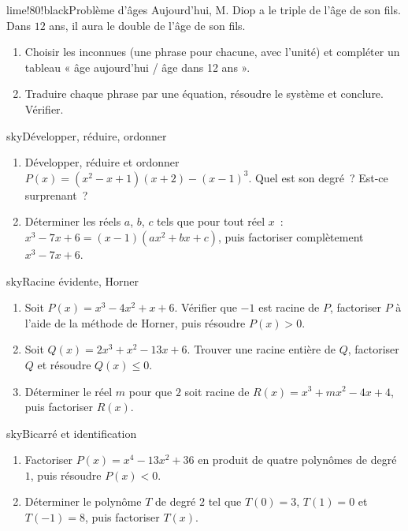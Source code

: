 \begin{exo}{lime!80!black}{Problème d'âges }
Aujourd'hui, M. Diop a le triple de l'âge de son fils. Dans $12$ ans, il aura le double de l'âge de son fils.
\begin{enumerate}
  \item Choisir les inconnues (une phrase pour chacune, avec l'unité) et compléter un tableau « âge aujourd'hui / âge dans 12 ans ».
  \item Traduire chaque phrase par une équation, résoudre le système et conclure. Vérifier.
\end{enumerate}
\end{exo}


\begin{exo}{sky}{Développer, réduire, ordonner }
\begin{enumerate}
  \item Développer, réduire et ordonner $P(x)=(x^2-x+1)(x+2)-(x-1)^3$. Quel est son degré~? Est-ce surprenant~?
  \item Déterminer les réels $a$, $b$, $c$ tels que pour tout réel $x$~: $x^3-7x+6=(x-1)(ax^2+bx+c)$, puis factoriser complètement $x^3-7x+6$.
\end{enumerate}
\end{exo}

\begin{exo}{sky}{Racine évidente, Horner }
\begin{enumerate}
  \item Soit $P(x)=x^3-4x^2+x+6$. Vérifier que $-1$ est racine de $P$, factoriser $P$ à l'aide de la méthode de Horner, puis résoudre $P(x)>0$.
  \item Soit $Q(x)=2x^3+x^2-13x+6$. Trouver une racine entière de $Q$, factoriser $Q$ et résoudre $Q(x)\leq0$.
  \item Déterminer le réel $m$ pour que $2$ soit racine de $R(x)=x^3+mx^2-4x+4$, puis factoriser $R(x)$.
\end{enumerate}
\end{exo}

\begin{exo}{sky}{Bicarré et identification }
\begin{enumerate}
  \item Factoriser $P(x)=x^4-13x^2+36$ en produit de quatre polynômes de degré $1$, puis résoudre $P(x)<0$.
  \item Déterminer le polynôme $T$ de degré $2$ tel que $T(0)=3$, $T(1)=0$ et $T(-1)=8$, puis factoriser $T(x)$.
\end{enumerate}
\end{exo}

